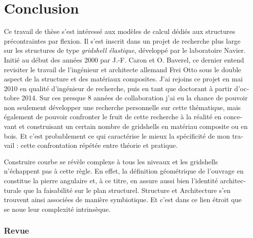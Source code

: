 

\newrefsegment

\chapter*{Conclusion}\label{chp=conclu}

\begin{otherlanguage}{french}

Ce travail de thèse s'est intéressé aux modèles de calcul dédiés aux structures précontraintes par flexion. Il s'est inscrit dans un projet de recherche plus large sur les structures de type \emph{gridshell élastique}, développé par le laboratoire Navier. Initié au début des années 2000 par J.-F. Caron et O. Baverel, ce dernier entend revisiter le travail de l'ingénieur et architecte allemand Frei Otto sous le double aspect de la structure et des matériaux composites. J'ai rejoins ce projet en mai 2010 en qualité d'ingénieur de recherche, puis en tant que doctorant à partir d'octobre 2014. Sur ces presque 8 années de collaboration j'ai eu la chance de pouvoir non seulement développer une recherche personnelle sur cette thématique, mais également de pouvoir confronter le fruit de cette recherche à la réalité en concevant et construisant un certain nombre de gridshells en matériau composite ou en bois. Et c'est probablement ce qui caractérise le mieux la spécificité de mon travail : cette confrontation répétée entre théorie et pratique.

Construire courbe se révèle complexe à tous les niveaux et les gridshells n'échappent pas à cette règle. En effet, la définition géométrique de l'ouvrage en constitue la pierre angulaire et, à ce titre, en assure aussi bien l'identité architecturale que la faisabilité sur le plan structurel. Structure et Architecture s'en trouvent ainsi associées de manière symbiotique. Et c'est dans ce lien étroit que se noue leur complexité intrinsèque.

\subsection*{Revue}


\end{otherlanguage}
